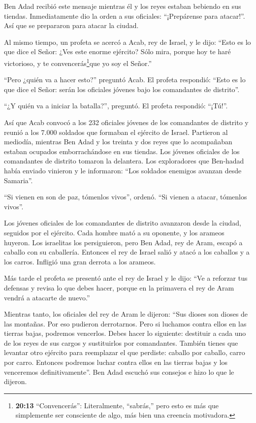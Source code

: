  Ben Adad recibió este mensaje mientras él y los reyes
estaban bebiendo en sus tiendas. Inmediatamente dio la orden a sus
oficiales: ``¡Prepárense para atacar!''. Así que se prepararon para
atacar la ciudad.

 Al mismo tiempo, un profeta se acercó a Acab, rey de
Israel, y le dijo: ``Esto es lo que dice el Señor: ¿Ves este enorme
ejército? Sólo mira, porque hoy te haré victorioso, y te
convencerás\footnote{\textbf{20:13} ``Convencerás'': Literalmente,
  ``sabrás,'' pero esto es más que simplemente ser consciente de algo,
  más bien una creencia motivadora.}que yo soy el Señor.''

 ``Pero ¿quién va a hacer esto?'' preguntó Acab. El profeta
respondió: ``Esto es lo que dice el Señor: serán los oficiales jóvenes
bajo los comandantes de distrito''.

``¿Y quién va a iniciar la batalla?'', preguntó. El profeta respondió:
``¡Tú!''.

 Así que Acab convocó a los 232 oficiales jóvenes de los
comandantes de distrito y reunió a los 7.000 soldados que formaban el
ejército de Israel.  Partieron al mediodía, mientras Ben
Adad y los treinta y dos reyes que lo acompañaban estaban ocupados
emborrachándose en sus tiendas.  Los jóvenes oficiales de
los comandantes de distrito tomaron la delantera. Los exploradores que
Ben-hadad había enviado vinieron y le informaron: ``Los soldados
enemigos avanzan desde Samaria''.

 ``Si vienen en son de paz, tómenlos vivos'', ordenó. ``Si
vienen a atacar, tómenlos vivos''.

 Los jóvenes oficiales de los comandantes de distrito
avanzaron desde la ciudad, seguidos por el ejército.  Cada
hombre mató a su oponente, y los arameos huyeron. Los israelitas los
persiguieron, pero Ben Adad, rey de Aram, escapó a caballo con su
caballería.  Entonces el rey de Israel salió y atacó a los
caballos y a los carros. Infligió una gran derrota a los arameos.

 Más tarde el profeta se presentó ante el rey de Israel y
le dijo: ``Ve a reforzar tus defensas y revisa lo que debes hacer,
porque en la primavera el rey de Aram vendrá a atacarte de nuevo.''

 Mientras tanto, los oficiales del rey de Aram le dijeron:
``Sus dioses son dioses de las montañas. Por eso pudieron derrotarnos.
Pero si luchamos contra ellos en las tierras bajas, podremos vencerlos.
 Debes hacer lo siguiente: destituir a cada uno de los
reyes de sus cargos y sustituirlos por comandantes. 
También tienes que levantar otro ejército para reemplazar el que
perdiste: caballo por caballo, carro por carro. Entonces podremos luchar
contra ellos en las tierras bajas y los venceremos definitivamente''.
Ben Adad escuchó sus consejos e hizo lo que le dijeron.

